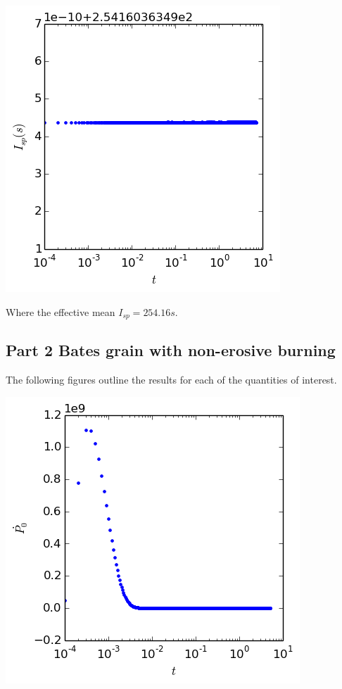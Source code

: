 \documentclass[cleanfoot,cleanhead,twocolumn,10pt,notitlepage]{asme2e}
\begin{document}
\includegraphics[width=\linewidth]{../python_stuff/Part1/Isp.png}

Where the effective mean $I_{sp}=254.16 s$.


\subsection{Part 2 Bates grain with non-erosive burning}

The following figures outline the results for each of the quantities of interest.

\includegraphics[width=\linewidth]{../python_stuff/Part2/P0_dot.png}
\end{document}
